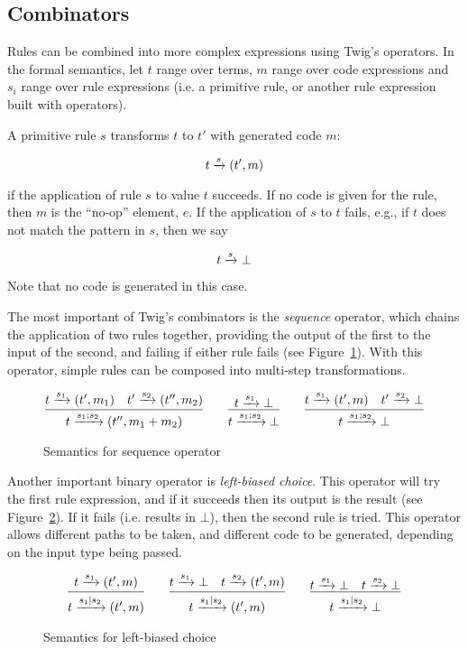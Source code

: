 \subsection{Combinators}

Rules can be combined into more complex expressions using Twig's operators. In
the formal semantics, let $t$ range over terms, $m$ range over code
expressions and $s_i$ range over rule expressions (i.e. a primitive rule, or
another rule expression built with operators).

A primitive rule $s$ transforms $t$ to $t'$ with generated code $m$:

\[
t \xrightarrow{s} (t',m)
\]

if the application of rule $s$ to value $t$ succeeds. If no code is given for
the rule, then $m$ is the ``no-op'' element, $e$. If the application of $s$ to
$t$ fails, e.g., if $t$ does not match the pattern in $s$, then we say

\[
t \xrightarrow{s} \bot
\]

Note that no code is generated in this case.

The most important of Twig's combinators is the \emph{sequence} operator,
which chains the application of two rules together, providing the output of
the first to the input of the second, and failing if either rule fails (see
Figure~\ref{semantics:sequence}). With this operator, simple rules can be
composed into multi-step transformations.

\begin{figure}[ht]
\label{semantics:sequence}
\[
\infer{t \arr{s_1;s_2} (t'',m_1+m_2)}{t \arr{s_1} (t',m_1) \quad t' \arr{s_2} (t'',m_2)}
\qquad 
\infer{t \arr{s_1;s_2} \bot}{t \arr{s_1} \bot}
\qquad
\infer{t \arr{s_1;s_2} \bot}{t \arr{s_1} (t',m) \quad t' \arr{s_2} \bot}
\]
\caption{Semantics for sequence operator}
\end{figure}

Another important binary operator is \emph{left-biased choice}. This operator
will try the first rule expression, and if it succeeds then its output is the
result (see Figure~\ref{semantics:choice}). If it fails (i.e. results in
$\bot$), then the second rule is tried. This operator allows different paths
to be taken, and different code to be generated, depending on the input type
being passed.

\begin{figure}[ht]
\label{semantics:choice}
\[
\infer{t \arr{s_1|s_2} (t',m)}{t \arr{s_1} (t',m)}
\qquad 
\infer{t \arr{s_1|s_2} (t',m)}{t \arr{s_1} \bot \quad t \arr{s_2} (t',m)}
\qquad
\infer{t \arr{s_1|s_2} \bot}{t \arr{s_1} \bot \quad t \arr{s_2} \bot}
\]
\caption{Semantics for left-biased choice}
\end{figure}

